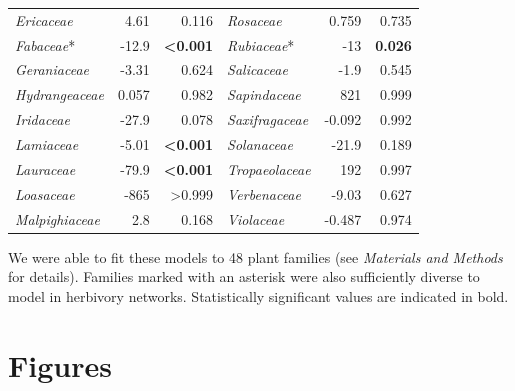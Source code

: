 \documentclass[12pt]{article}
\begin{document}
\begin{table}[!h]
\begin{tabular}{|l  rr|| l rr|}
    \emph{Ericaceae}  & 4.61  & 0.116 & \emph{Rosaceae} & 0.759 & 0.735 \\
    \emph{Fabaceae}*  & -12.9 & \textbf{\textless0.001} & \emph{Rubiaceae}* & -13 & \textbf{0.026}  \\
    \emph{Geraniaceae}  & -3.31 & 0.624 & \emph{Salicaceae} & -1.9  & 0.545 \\
    \emph{Hydrangeaceae}  & 0.057 & 0.982 & \emph{Sapindaceae}  & 821 & 0.999 \\
    \emph{Iridaceae}  & -27.9 & 0.078 & \emph{Saxifragaceae}  & -0.092  & 0.992 \\
    \emph{Lamiaceae}  & -5.01 & \textbf{\textless0.001} & \emph{Solanaceae} & -21.9 & 0.189 \\
    \emph{Lauraceae}  & -79.9 & \textbf{\textless0.001} & \emph{Tropaeolaceae}  & 192 & 0.997 \\
    \emph{Loasaceae}  & -865  & \textgreater0.999 & \emph{Verbenaceae}  & -9.03 & 0.627 \\
    \emph{Malpighiaceae}  & 2.8 & 0.168 & \emph{Violaceae}  & -0.487  & 0.974 \\
  \hline
  \end{tabular}
  \smallskip
  \footnotesize

    We were able to fit these models to 48 plant families (see \emph{Materials and Methods} for details). 
    Families marked with an asterisk were also sufficiently diverse to model in herbivory networks. 
    Statistically significant values are indicated in bold. 

    \end{table}

\clearpage


\section*{Figures}
\end{document}
